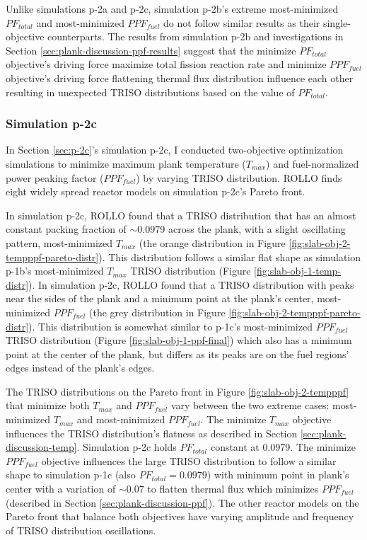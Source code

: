Unlike simulations p-2a and p-2c, simulation p-2b's extreme most-minimized $PF_{total}$ 
and most-minimized $PPF_{fuel}$ do not follow similar results as their single-objective 
counterparts.  
The results from simulation p-2b and investigations in Section 
\ref{sec:plank-discussion-ppf-results} suggest that the minimize $PF_{total}$ 
objective's driving force maximize total fission reaction rate and 
minimize $PPF_{fuel}$ objective's driving force flattening thermal flux distribution 
influence each other resulting in unexpected TRISO distributions based 
on the value of $PF_{total}$. 

\subsubsection{Simulation p-2c}
In Section \ref{sec:p-2c}'s simulation p-2c, I conducted two-objective 
optimization simulations to minimize maximum plank temperature ($T_{max}$) and 
fuel-normalized power peaking factor ($PPF_{fuel}$) by varying TRISO distribution. 
\gls{ROLLO} finds eight widely spread reactor models on simulation p-2c's Pareto 
front. 

In simulation p-2c, \gls{ROLLO} found that a TRISO distribution that has an almost 
constant packing fraction of $\sim0.0979$ across the plank, with a 
slight oscillating pattern, most-minimized $T_{max}$ 
(the orange distribution in Figure \ref{fig:slab-obj-2-tempppf-pareto-distr}). 
This distribution follows a similar flat shape as simulation p-1b's most-minimized 
$T_{max}$ TRISO distribution (Figure \ref{fig:slab-obj-1-temp-distr}).
In simulation p-2c, \gls{ROLLO} found that a TRISO distribution with peaks near the 
sides of the plank and a minimum point at the plank's center, most-minimized 
$PPF_{fuel}$ (the grey distribution in Figure 
\ref{fig:slab-obj-2-tempppf-pareto-distr}). 
This distribution is somewhat similar to p-1c's most-minimized $PPF_{fuel}$ TRISO 
distribution (Figure \ref{fig:slab-obj-1-ppf-final}) which also has a minimum point 
at the center of the plank, but differs as its peaks are on the fuel regions' edges 
instead of the plank's edges. 

The \gls{TRISO} distributions on the Pareto front in Figure \ref{fig:slab-obj-2-tempppf} 
that minimize both $T_{max}$ and $PPF_{fuel}$ vary between the two extreme cases: 
most-minimized $T_{max}$ and most-minimized $PPF_{fuel}$. 
The minimize $T_{max}$ objective influences the TRISO distribution's flatness as 
described in Section \ref{sec:plank-discussion-temp}.
Simulation p-2c holds $PF_{total}$ constant at 0.0979. 
The minimize $PPF_{fuel}$ objective influences the large TRISO distribution to follow 
a similar shape to simulation p-1c (also $PF_{total} = 0.0979$) with minimum point in 
plank's center with a variation of $\sim0.07$ to flatten thermal flux which 
minimizes $PPF_{fuel}$ (described in Section \ref{sec:plank-discussion-ppf}). 
The other reactor models on the Pareto front that balance both objectives have 
varying amplitude and frequency of TRISO distribution oscillations. 

